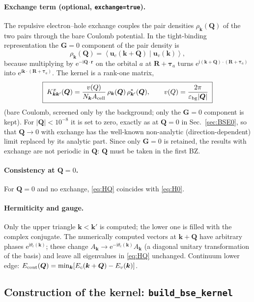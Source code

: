 \documentclass[11pt,a4paper]{article}
\newcommand{\ii}{\mathrm{i}}
\newcommand{\ee}{\mathrm{e}}
\newcommand{\kk}{\bm{k}}
\newcommand{\QQ}{\bm{Q}}
\newcommand{\GG}{\bm{G}}
\newcommand{\RR}{\bm{R}}
\newcommand{\ttau}{\bm{\tau}}
\newcommand{\braket}[2]{\left\langle#1\middle|#2\right\rangle}
\newcommand{\code}[1]{\texttt{#1}}
\newcommand{\Acell}{A_{\rm cell}}
\newcommand{\Nk}{N_{\bm k}}
\begin{document}
\paragraph{Exchange term (optional, \code{exchange=true}).}
The repulsive electron--hole exchange couples the pair densities $\rho_{\kk}(\QQ)$ of the two pairs through the bare Coulomb potential. In the tight-binding representation the $\bm G=0$ component of the pair density is
\begin{equation}
\rho_{\kk}(\QQ)=\braket{\bm u_c(\kk+\QQ)}{\bm u_v(\kk)},
\end{equation}
because multiplying by $\ee^{-\ii\QQ\cdot\bm r}$ on the orbital $a$ at $\RR+\ttau_a$ turns $\ee^{\ii(\kk+\QQ)\cdot(\RR+\ttau_a)}$ into $\ee^{\ii\kk\cdot(\RR+\ttau_a)}$. The kernel is a rank-one matrix,
\begin{equation}
\boxed{\;K^x_{\kk\kk'}(\QQ)=\frac{v(Q)}{\Nk\Acell}\,\rho_{\kk}(\QQ)\,\rho_{\kk'}^*(\QQ),\qquad v(Q)=\frac{2\pi}{\varepsilon_{\rm bg}|\QQ|}\;}
\label{eq:Kx}
\end{equation}
(bare Coulomb, screened only by the background; only the $\bm G=0$ component is kept). For $|\QQ|<10^{-8}$ it is set to zero, exactly as at $\bm Q=0$ in Sec.~\ref{sec:BSE0}, so that $\QQ\to0$ with exchange has the well-known non-analytic (direction-dependent) limit replaced by its analytic part. Since only $\GG=0$ is retained, the results with exchange are not periodic in $\QQ$: $\QQ$ must be taken in the first BZ.

\paragraph{Consistency at $\QQ=0$.} For $\QQ=0$ and no exchange, \eqref{eq:HQ} coincides with \eqref{eq:H0}.

\paragraph{Hermiticity and gauge.} Only the upper triangle $\kk<\kk'$ is computed; the lower one is filled with the complex conjugate. The numerically computed vectors at $\kk+\QQ$ have arbitrary phases $\ee^{\ii\theta_{c}(\kk)}$; these change $A_{\kk}\to \ee^{-\ii\theta_c(\kk)}A_{\kk}$ (a diagonal unitary transformation of the basis) and leave all eigenvalues in \eqref{eq:HQ} unchanged. Continuum lower edge: $E_{\rm cont}(\QQ)=\min_{\kk}[E_c(\kk+\QQ)-E_v(\kk)]$.

\subsection{Construction of the kernel: \code{build\_bse\_kernel}}
\label{sec:kernel}
\end{document}
